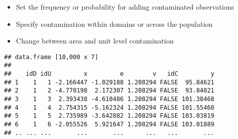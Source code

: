 \begin{itemize}
\itemsep1pt\parskip0pt
\item
  Set the frequency or probability for adding contaminated observations
\item
  Specify contamination within domains or across the population
\item
  Change between area and unit level contamination
\end{itemize}

\begin{Shaded}
\end{Shaded}

\begin{verbatim}
## data.frame [10,000 x 7]
## 
##    idD idU         x         e        v   idC         y
## 1    1   1 -2.166447 -1.029188 1.208294 FALSE  95.84621
## 2    1   2 -4.770198  2.172307 1.208294 FALSE  93.84021
## 3    1   3  2.393438 -4.610486 1.208294 FALSE 101.38468
## 4    1   4  2.754315 -5.162324 1.208294 FALSE 101.55460
## 5    1   5  2.735989 -3.642082 1.208294 FALSE 103.03819
## 6    1   6 -2.055526  5.921647 1.208294 FALSE 103.01889
## .. ... ...       ...       ...      ...   ...       ...
\end{verbatim}

\begin{Shaded}
\end{Shaded}

